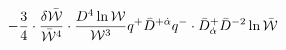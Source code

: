 \begin{equation}\label{f_term}
-{3 \over
4}\cdot { \delta \bar{\cal W}\over \bar{\cal W}^4}\cdot {D^4 \ln {\cal
W}\over {\cal W}^3} q^{+}\bar{D}^{+\dot\alpha}q^{-}\cdot
\bar{D}^{+}_{\dot\alpha}\bar{D}^{-2}\ln \bar{\cal W}
\end{equation}

